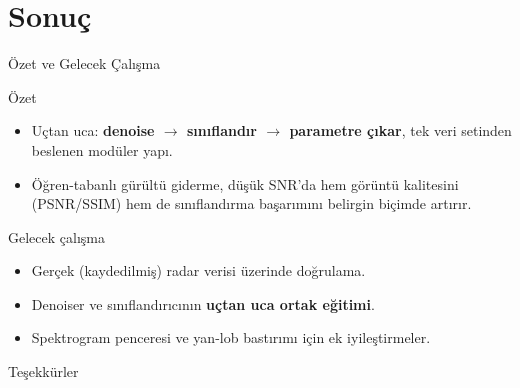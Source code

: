 \documentclass[aspectratio=169]{beamer}
\begin{document}
\section{Sonuç}
\begin{frame}{Özet ve Gelecek Çalışma}
  \begin{block}{Özet}
    \begin{itemize}\small
      \item Uçtan uca: \textbf{denoise $\rightarrow$ sınıflandır $\rightarrow$
            parametre çıkar}, tek veri setinden beslenen modüler yapı.
      \item Öğren-tabanlı gürültü giderme, düşük SNR'da hem görüntü kalitesini
            (PSNR/SSIM) hem de sınıflandırma başarımını belirgin biçimde artırır.
    \end{itemize}
  \end{block}
  \begin{block}{Gelecek çalışma}
    \begin{itemize}\small
      \item Gerçek (kaydedilmiş) radar verisi üzerinde doğrulama.
      \item Denoiser ve sınıflandırıcının \textbf{uçtan uca ortak eğitimi}.
      \item Spektrogram penceresi ve yan-lob bastırımı için ek iyileştirmeler.
    \end{itemize}
  \end{block}
  \vfill
  \begin{center}\Large Teşekkürler\end{center}
\end{frame}
\end{document}
